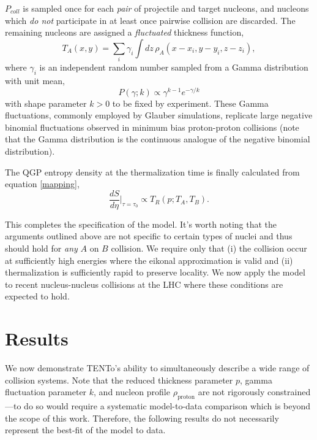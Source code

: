\documentclass[aps,prc,reprint,amsmath,nofootinbib]{revtex4-1}
\newcommand{\trento}{T\raisebox{-.5ex}{R}ENTo}
\begin{document}
$P_{coll}$ is sampled once for each \emph{pair} of projectile and target nucleons, and nucleons which \emph{do not} participate in at least once pairwise collision are 
discarded. The remaining nucleons are assigned a \emph{fluctuated} thickness function,
\begin{equation}
 T_{A}(x,y) = \sum\limits_i \gamma_i \int dz\, \rho_{A}(x-x_i,y-y_i,z-z_i),
\end{equation}
where $\gamma_i$ is an independent random number sampled from a Gamma distribution with unit mean,
\begin{equation}
 P(\gamma;k) \propto \gamma^{k-1} e^{-\gamma/k}
\end{equation}
with shape parameter $k>0$ to be fixed by experiment. These Gamma fluctuations, commonly employed by Glauber simulations, replicate large negative binomial fluctuations 
observed in minimum bias proton-proton collisions (note that the Gamma distribution is the continuous analogue of the negative binomial distribution).

The QGP entropy density at the  thermalization time is finally calculated from equation \ref{mapping},
\begin{equation}
 \frac{dS}{d\eta} \bigg|_{\tau=\tau_0} \propto T_R(p;T_A,T_B).
\end{equation}

This completes the specification of the model. It's worth noting that the arguments outlined above are not specific to certain types of nuclei and thus should hold 
for \emph{any} $A$ on $B$ collision. We require only that (i) the collision occur at sufficiently high energies where the eikonal approximation is valid and (ii) 
thermalization is sufficiently rapid to preserve locality. We now apply the model to recent nucleus-nucleus collisions at the LHC where these conditions are expected to hold.

\section{Results}

We now demonstrate \trento's ability to simultaneously describe a wide range of collision systems. Note that the reduced thickness parameter $p$, gamma fluctuation 
parameter $k$, and nucleon profile $\rho_\text{proton}$ are not rigorously constrained---to do so would require a systematic model-to-data comparison which is beyond the 
scope of this work. Therefore, the following results do not necessarily represent the best-fit of the model to data.
\end{document}
